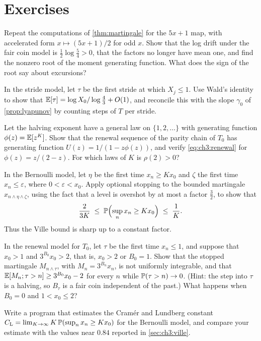 \section*{Exercises}

\begin{exercise}\label{ex:ch3:fivex}
Repeat the computations of \cref{thm:martingale} for the $5x+1$ map, with
accelerated form $x\mapsto(5x+1)/2$ for odd $x$. Show that the log drift under
the fair coin model is $\frac12\log\frac54>0$, that the factors no longer have
mean one, and find the nonzero root of the moment generating function. What
does the sign of the root say about excursions?
\end{exercise}

\begin{exercise}\label{ex:ch3:wald}
In the stride model, let $\tau$ be the first stride at which $X_j\le1$. Use
Wald's identity to show that $\mathbb{E}[\tau]=\log X_0/\log\frac43+O(1)$, and
reconcile this with the slope $\gamma_0$ of \cref{prop:lyapunov} by counting
steps of $T$ per stride.
\end{exercise}

\begin{exercise}\label{ex:ch3:renewal}
Let the halving exponent have a general law on $\{1,2,\ldots\}$ with
generating function $\phi(z)=\mathbb{E}[z^K]$. Show that the renewal sequence of the
parity chain of $T_0$ has generating function $U(z)=1/(1-z\phi(z))$, and
verify \eqref{eq:ch3:renewal} for $\phi(z)=z/(2-z)$. For which laws of $K$ is
$\rho(2)>0$?
\end{exercise}

\begin{exercise}\label{ex:ch3:ville}
In the Bernoulli model, let $\eta$ be the first time $x_n\geq Kx_0$ and
$\zeta$ the first time $x_n\le\varepsilon$, where $0<\varepsilon<x_0$. Apply
optional stopping to the bounded martingale $x_{n\wedge\eta\wedge\zeta}$, using
the fact that a level is overshot by at most a factor $\frac32$, to show that
\[
  \frac{2}{3K}\;\le\;\mathbb{P}\Bigl(\sup_nx_n\geq Kx_0\Bigr)\;\le\;\frac1K .
\]
Thus the Ville bound is sharp up to a constant factor.
\end{exercise}

\begin{exercise}\label{ex:ch3:standardui}
In the renewal model for $T_0$, let $\tau$ be the first time $x_n\le1$, and suppose that $x_0>1$ and $3^{B_0}x_0>2$, that is, $x_0>2$ or $B_0=1$. Show
that the stopped martingale $M_{n\wedge\tau}$, with $M_n=3^{B_n}x_n$, is not
uniformly integrable, and that $\mathbb{E}[M_n;\tau>n]\geq3^{B_0}x_0-2$ for every $n$
while $\mathbb{P}(\tau>n)\to0$. (Hint: the step into $\tau$ is a halving, so $B_\tau$ is a fair coin independent of the past.) What happens when $B_0=0$ and $1<x_0\le2$?
\end{exercise}

\begin{exercise}\label{ex:ch3:simulate}
Write a program that estimates the Cram\'er and Lundberg constant
$C_{\mathrm L}=\lim_{K\to\infty}K\,\mathbb{P}(\sup_nx_n\geq Kx_0)$ for the Bernoulli model, and
compare your estimate with the values near $0.84$ reported in
\cref{sec:ch3:ville}.
\end{exercise}
